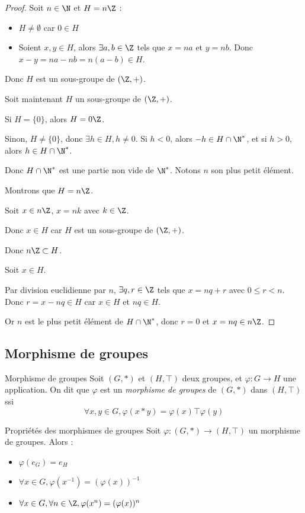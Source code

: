 \begin{proof}
    Soit $n \in \N$ et $H = n \Z$ : 
    \begin{itemize}
        \item $H \neq \emptyset$ car $0 \in H$
        \item Soient $x, y \in H$, alors $\exists a, b \in \Z$ tels que $x = na$ et $y = nb$.
        Donc $x - y = na - nb = n(a - b) \in H$.
    \end{itemize}

    Donc $H$ est un sous-groupe de $(\Z, +)$.

    Soit maintenant $H$ un sous-groupe de $(\Z, +)$. 
    
    Si $H = \{0\}$, alors $H = 0 \Z$.

    Sinon, $H \neq \{0\}$, donc $\exists h \in H, h \neq 0$.
    Si $h < 0$, alors $-h \in H \cap \N^*$, et si $h > 0$, alors $h \in H \cap \N^*$.

    Donc $H \cap \N^*$ est une partie non vide de $\N^*$. Notons $n$ son plus petit élément.

    Montrons que $H = n \Z$.
    
    Soit $x \in n \Z$, $x = nk$ avec $k \in \Z$.

    Donc $x \in H$ car $H$ est un sous-groupe de $(\Z, +)$.

    Donc $n \Z \subset H$.

    Soit $x \in H$. 

    Par division euclidienne par $n$, $\exists q, r \in \Z$ tels que $x = nq + r$ avec $0 \leq r < n$.
    Donc $r = x - nq \in H$ car $x \in H$ et $nq \in H$.

    Or $n$ est le plus petit élément de $H \cap \N^*$, donc $r = 0$ et $x = nq \in n \Z$.
\end{proof}

\subsection{Morphisme de groupes }

\begin{definition}{Morphisme de groupes}{}
    Soit $(G, \ast)$ et $(H, \top)$ deux groupes, et $\varphi : G \to H$ une application.
    On dit que $\varphi$ est un \emph{morphisme de groupes} de $(G, \ast)$ dans $(H, \top)$ ssi
    $$\forall x, y \in G, \varphi(x \ast y) = \varphi(x) \top \varphi(y)$$
\end{definition}

\begin{proposition}{Propriétés des morphismes de groupes}{}
    Soit $\varphi : (G, \ast) \to (H, \top)$ un morphisme de groupes.
    Alors :
    \begin{itemize}
        \item $\varphi(e_G) = e_H$
        \item $\forall x \in G, \varphi(x^{-1}) = (\varphi(x))^{-1}$
        \item $\forall x \in G, \forall n \in \Z, \varphi(x^n) = (\varphi(x))^n$
    \end{itemize}
\end{proposition}

